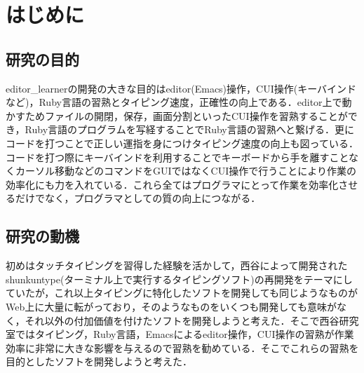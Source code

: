\chapter{はじめに}\label{ux306fux3058ux3081ux306b}

    \section{研究の目的}\label{ux7814ux7a76ux306eux76eeux7684}

    editor\_learnerの開発の大きな目的はeditor(Emacs)操作，CUI操作(キーバインドなど)，Ruby言語の習熟とタイピング速度，正確性の向上である．editor上で動かすためファイルの開閉，保存，画面分割といったCUI操作を習熟することができ，Ruby言語のプログラムを写経することでRuby言語の習熟へと繋げる．更にコードを打つことで正しい運指を身につけタイピング速度の向上も図っている．コードを打つ際にキーバインドを利用することでキーボードから手を離すことなくカーソル移動などのコマンドをGUIではなくCUI操作で行うことにより作業の効率化にも力を入れている．これら全てはプログラマにとって作業を効率化させるだけでなく，プログラマとしての質の向上につながる．

    \section{研究の動機}\label{ux7814ux7a76ux306eux52d5ux6a5f}

    初めはタッチタイピングを習得した経験を活かして，西谷によって開発されたshunkuntype(ターミナル上で実行するタイピングソフト)の再開発をテーマにしていたが，これ以上タイピングに特化したソフトを開発しても同じようなものがWeb上に大量に転がっており，そのようなものをいくつも開発しても意味がなく，それ以外の付加価値を付けたソフトを開発しようと考えた．そこで西谷研究室ではタイピング，Ruby言語，Emacsによるeditor操作，CUI操作の習熟が作業効率に非常に大きな影響を与えるので習熟を勧めている．そこでこれらの習熟を目的としたソフトを開発しようと考えた．

    